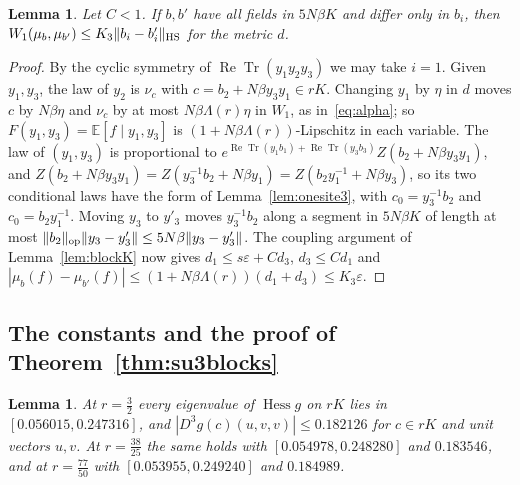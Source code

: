 \documentclass[11pt]{amsart}
\newtheorem{lemma}[theorem]{Lemma}
\theoremstyle{definition}
\theoremstyle{remark}
\numberwithin{equation}{section}
\newcommand{\E}{\mathbb{E}}
\newcommand{\ReTr}{\operatorname{Re}\operatorname{Tr}}
\newcommand{\Hess}{\operatorname{Hess}}
\begin{document}
\begin{lemma}\label{lem:blockK3}
Let $C<1$. If $b,b'$ have all fields in $5N\beta K$ and differ only in $b_i$,
then $W_1(\mu_b,\mu_{b'})\le K_3\|b_i-b'_i\|_{\rm HS}$ for the metric $d$.
\end{lemma}

\begin{proof}
By the cyclic symmetry of $\ReTr(y_1y_2y_3)$ we may take $i=1$. Given
$y_1,y_3$, the law of $y_2$ is $\nu_c$ with $c=b_2+N\beta y_3y_1\in rK$.
Changing $y_1$ by $\eta$ in $d$ moves $c$ by $N\beta\eta$ and $\nu_c$ by at most
$N\beta\Lambda(r)\eta$ in $W_1$, as in~\eqref{eq:alpha}; so $F(y_1,y_3)=
\E[f\mid y_1,y_3]$ is $(1+N\beta\Lambda(r))$-Lipschitz in each variable. The
law of $(y_1,y_3)$ is proportional to $e^{\ReTr(y_1b_1)+\ReTr(y_3b_3)}
Z(b_2+N\beta y_3y_1)$, and $Z(b_2+N\beta y_3y_1)=Z(y_3^{-1}b_2+N\beta y_1)=
Z(b_2y_1^{-1}+N\beta y_3)$, so its two conditional laws have the form of
Lemma~\ref{lem:onesite3}, with $c_0=y_3^{-1}b_2$ and $c_0=b_2y_1^{-1}$.
Moving $y_3$ to $y'_3$ moves $y_3^{-1}b_2$ along a segment in $5N\beta K$ of
length at most $\|b_2\|_{\rm op}\|y_3-y'_3\|\le5N\beta\|y_3-y'_3\|$. The
coupling argument of Lemma~\ref{lem:blockK} now gives $d_1\le s\varepsilon+
Cd_3$, $d_3\le Cd_1$ and $|\mu_b(f)-\mu_{b'}(f)|\le(1+N\beta\Lambda(r))(d_1+
d_3)\le K_3\varepsilon$.
\end{proof}

\subsection{The constants and the proof of Theorem~\ref{thm:su3blocks}}

\begin{lemma}\label{lem:su3const}
At $r=\frac32$ every eigenvalue of $\Hess g$ on $rK$ lies in
$[0.056015,0.247316]$, and $|D^3g(c)(u,v,v)|\le0.182126$ for $c\in rK$ and
unit vectors $u,v$. At $r=\frac{38}{25}$ the same holds with
$[0.054978,0.248280]$ and $0.183546$, and at $r=\frac{77}{50}$ with
$[0.053955,0.249240]$ and $0.184989$.
\end{lemma}
\end{document}
